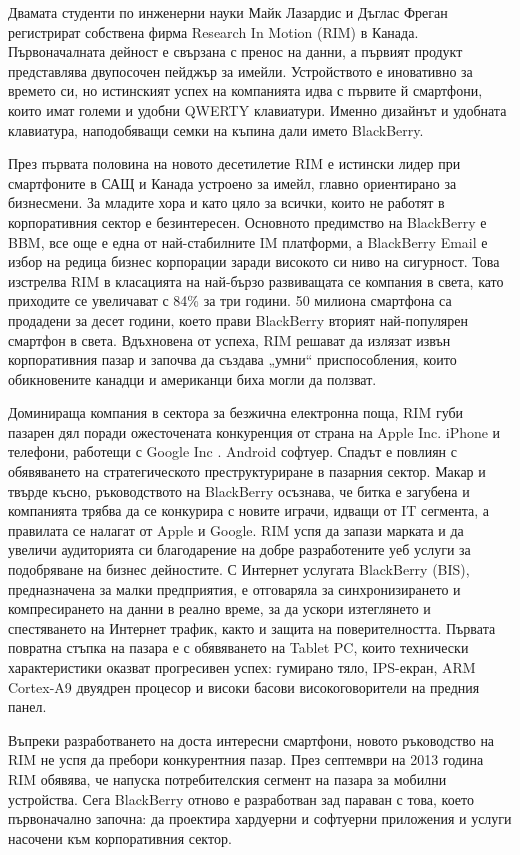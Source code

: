 Двамата студенти по инженерни науки Майк Лазардис и Дъглас Фреган регистрират собствена фирма Research In Motion (RIM) в Канада. Първоначалната дейност е свързана с пренос на данни, а първият продукт представлява двупосочен пейджър за имейли. Устройството е иновативно за времето си, но истинският успех на компанията идва с първите й смартфони, които имат големи и удобни QWERTY клавиатури. Именно дизайнът и удобната клавиатура, наподобяващи  семки на къпина дали името BlackBerry.

През първата половина на новото десетилетие RIM е истински лидер при смартфоните в САЩ и Канада устроено за имейл, главно ориентирано за бизнесмени. За младите хора и като цяло за всички, които не работят в корпоративния сектор е безинтересен. Основното предимство на BlackBerry е BBM, все още е една от най-стабилните IM платформи, а BlackBerry Email е избор на редица бизнес корпорации заради високото си ниво на сигурност. Това изстрелва RIM в класацията на най-бързо развиващата се компания в света, като приходите се увеличават с 84\% за три години. 50 милиона смартфона са продадени за десет години, което прави BlackBerry вторият най-популярен смартфон в света. Вдъхновена от успеха, RIM решават да излязат извън корпоративния пазар и започва да създава „умни“ приспособления, които обикновените канадци и американци биха могли да ползват.

Доминираща компания в сектора за безжична електронна поща, RIM губи пазарен дял поради ожесточената конкуренция от страна на Apple Inc. iPhone и телефони, работещи с Google Inc . Android софтуер. Спадът е повлиян с обявяването на стратегическото преструктуриране в пазарния сектор. Макар и твърде късно, ръководството на BlackBerry осъзнава, че битка е загубена и компанията трябва да се конкурира с новите играчи, идващи от IT сегмента, а правилата се налагат от Apple и Google. RIM успя да запази марката и да увеличи аудиторията си благодарение на добре разработените уеб услуги за подобряване на бизнес дейностите. С Интернет услугата BlackBerry (BIS), предназначена за малки предприятия, е отговаряла за синхронизирането и компресирането на данни в реално време, за да ускори изтеглянето и спестяването на Интернет трафик, както и защита на поверителността.
Първата повратна стъпка на пазара е с обявяването на Tablet PC, които технически характеристики оказват прогресивен успех: гумирано тяло, IPS-екран, ARM Cortex-A9 двуядрен процесор и високи басови високоговорители на предния панел.

Въпреки разработването на доста интересни смартфони, новото ръководство на RIM не успя да пребори конкурентния пазар. През септември на 2013 година RIM обявява, че напуска потребителския сегмент на пазара за мобилни устройства. Сега BlackBerry отново е разработван зад параван с това, което първоначално започна: да проектира хардуерни и софтуерни приложения и услуги насочени към корпоративния сектор.

